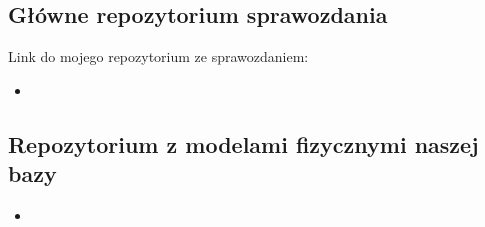 \documentclass[a4paper,11pt,english,openany,oneside]{sphinxmanual}
\begin{document}
\subsection{Główne repozytorium sprawozdania}
\label{\detokenize{rozdzial_1/index:glowne-repozytorium-sprawozdania}}
\sphinxAtStartPar
Link do mojego repozytorium ze sprawozdaniem:
\begin{itemize}
\item {} 
\sphinxAtStartPar
{} 

\end{itemize}


\subsection{Repozytorium z modelami fizycznymi naszej bazy}
\label{\detokenize{rozdzial_1/index:repozytorium-z-modelami-fizycznymi-naszej-bazy}}\begin{itemize}
\item {} 
\sphinxAtStartPar
{} 

\end{itemize}
\end{document}
